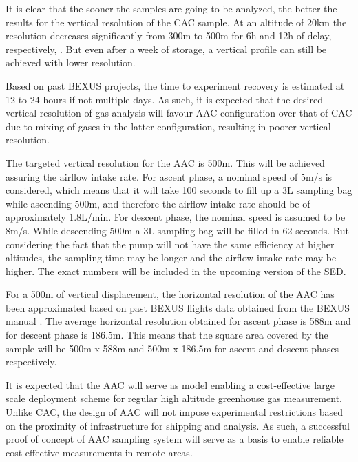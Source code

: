 \documentclass[a4paper,12pt,twoside]{article}
\begin{document}
It is clear that the sooner the samples are going to be analyzed, the better the results for the vertical resolution of the CAC sample. At an altitude of 20km the resolution decreases significantly from 300m to 500m for 6h and 12h of delay, respectively, \cite{Olivier}. But even after a week of storage, a vertical profile can still be achieved with lower resolution.

Based on past BEXUS projects, the time to experiment recovery is estimated at 12 to 24 hours if not multiple days. As such, it is expected that the desired vertical resolution of gas analysis will favour AAC configuration over that of CAC due to mixing of gases in the latter configuration, resulting in poorer vertical resolution.



The targeted vertical resolution for the AAC is 500m. This will be achieved assuring the airflow intake rate. For ascent phase, a nominal speed of 5m/s is considered, which means that it will take 100 seconds to fill up a 3L sampling bag while ascending 500m, and therefore the airflow intake rate should be of approximately 1.8L/min. For descent phase, the nominal speed is assumed to be 8m/s. While descending 500m a 3L sampling bag will be filled in 62 seconds.
But considering the fact that the pump will not have the same efficiency at higher altitudes, the sampling time may be longer and the airflow intake rate may be higher. The exact numbers will be included in the upcoming version of the SED.  

For a 500m of vertical displacement, the horizontal resolution of the AAC has been approximated based on past BEXUS flights data obtained from the BEXUS manual \cite{BexusManual}. The average horizontal resolution obtained for ascent phase is 588m and for descent phase is 186.5m. This means that the square area covered by the sample will be 500m x 588m and 500m x 186.5m for ascent and descent phases respectively.



It is expected that the AAC will serve as model enabling a cost-effective large scale deployment scheme for regular high altitude greenhouse gas measurement. Unlike CAC, the design of AAC will not impose experimental restrictions based on the proximity of infrastructure for shipping and analysis. As such, a successful proof of concept of AAC sampling system will serve as a basis to enable reliable cost-effective measurements in remote areas.
\end{document}
